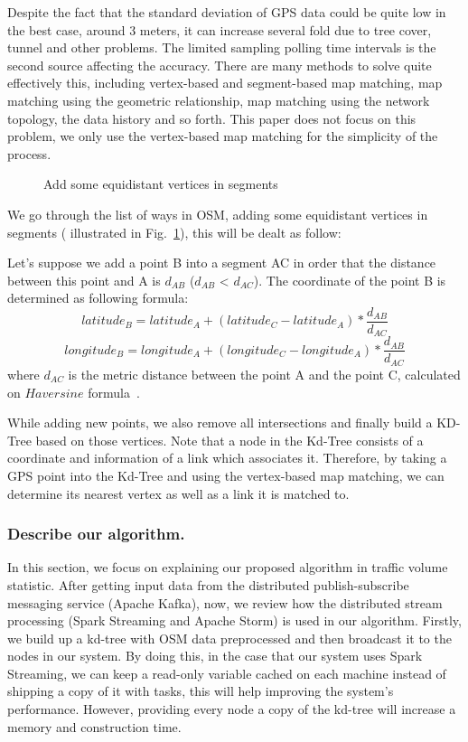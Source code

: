 \documentclass{acm_proc_article-sp}
\begin{document}
	\setlength{\parindent}{0.7cm} Despite the fact that the standard deviation of GPS data could be quite low in the best case, around 3 meters, it can increase several fold due to tree cover, tunnel and other problems. The limited sampling polling time intervals is the second source affecting the accuracy. There are many methods to solve quite effectively this, including vertex-based and segment-based map matching, map matching using the geometric relationship, map matching using the network topology, the data history and so forth. This paper does not focus on this problem, we only use the vertex-based map matching for the simplicity of the process.  
	
\begin{figure}[h]
\centering
{}
\caption{Add some equidistant vertices in segments}
\label{fig:addPointsToRoad}
\end{figure}
	
	 \setlength{\parindent}{0.7cm} We go through the list of ways in OSM, adding some equidistant vertices in segments ( illustrated in Fig.~\ref{fig:addPointsToRoad}), this will be dealt as follow: 

	Let's suppose we add a point B into a segment AC in order that the distance between this point and A is $d_{AB}$ ($d_{AB}$ < $d_{AC}$). The coordinate of the point B is determined as following formula:
\[ latitude_{B} = latitude_{A} + (latitude_{C} - latitude_{A}) \ast \frac{d_{AB}}{d_{AC}}\]
\[ longitude_{B} = longitude_{A} + (longitude_{C} - longitude_{A}) \ast \frac{d_{AB}}{d_{AC}}\]
where $d_{AC}$ is the metric distance between the point A and the point C, calculated on $Haversine$ formula~\cite{haversineweb}.

While adding new points, we also remove all intersections and finally build a KD-Tree based on those vertices. Note that a node in the Kd-Tree consists of a coordinate and information of a link which associates it. Therefore, by taking a GPS point into the Kd-Tree and using the vertex-based map matching, we can determine its nearest vertex as well as a link it is matched to.
	
\subsubsection{Describe our algorithm.}
		
In this section, we focus on explaining our proposed algorithm in traffic volume statistic. After getting input data from the distributed publish-subscribe messaging service (Apache Kafka), now, we review how the distributed stream processing (Spark Streaming and Apache Storm) is used in our algorithm. Firstly, we build up a kd-tree with OSM data preprocessed and then broadcast it to the nodes in our system. By doing this, in the case that our system uses Spark Streaming, we can keep a read-only variable cached on each machine instead of shipping a copy of it with tasks, this will help improving the system's performance. However, providing every node a copy of the kd-tree will increase a memory and construction time.
	
\end{document}
